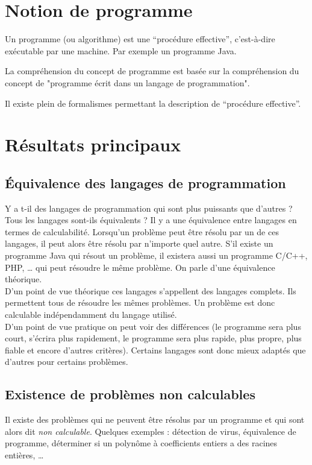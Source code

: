 \section{Notion de programme}
\label{sec:notion_de_programme}

Un programme (ou algorithme) est une ``procédure effective'', c'est-à-dire exécutable par une machine. Par exemple un programme Java.

La compréhension du concept de programme est basée sur la compréhension du concept de "programme écrit dans un langage de programmation".

Il existe plein de formalismes permettant la description de ``procédure effective''.

\section{Résultats principaux}
\label{sec:r_sultat_principaux}

\subsection{ Équivalence des langages de programmation}
\label{subsec:equivalence_des_langages_de_programmation}

Y a t-il des langages de programmation qui sont plus puissants que d'autres ? Tous les langages sont-ils équivalents ? 
\newline 
Il y a une équivalence entre langages en termes de calculabilité.  Lorsqu'un problème peut être résolu par un de ces langages, il peut alors être résolu par n'importe quel autre.   
S'il existe un programme Java qui résout un problème, il existera aussi un programme C/C++, PHP, … qui peut résoudre le même problème. On parle d'une équivalence théorique.\\
D'un point de vue théorique ces langages s'appellent des langages complets. Ils permettent tous de résoudre les mêmes problèmes.  Un problème est donc calculable indépendamment du langage utilisé. \\
D'un point de vue pratique on peut voir des différences (le programme sera plus court, s'écrira plus rapidement, le programme sera plus rapide, plus propre, plus fiable et encore d'autres critères).  Certains langages sont donc mieux adaptés que d'autres pour certains problèmes. 


\subsection{Existence de problèmes non calculables}
\label{subsec:existence_de_problemes_non_calculables}
	Il existe des problèmes qui ne peuvent être résolus par un programme et qui sont alors dit \emph{non calculable}. 
	Quelques exemples : 
		détection de virus,
        équivalence de programme,
        déterminer si un polynôme à coefficients entiers a des racines entières, \ldots
	
